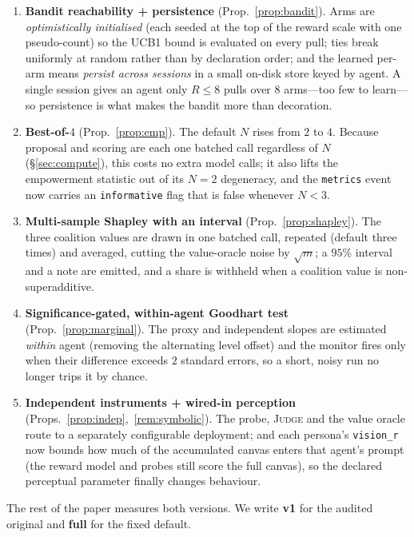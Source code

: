 \documentclass[11pt]{article}
\newcommand{\code}[1]{\texttt{\small #1}}
\newcommand{\JUDGE}{\textsc{Judge}}
\theoremstyle{plain}
\theoremstyle{definition}
\begin{document}
\begin{enumerate}[leftmargin=1.4em,itemsep=2pt,topsep=2pt]
\item \textbf{Bandit reachability + persistence} (Prop.~\ref{prop:bandit}). Arms
      are \emph{optimistically initialised} (each seeded at the top of the reward
      scale with one pseudo-count) so the UCB1 bound is evaluated on every pull;
      ties break uniformly at random rather than by declaration order; and the
      learned per-arm means \emph{persist across sessions} in a small on-disk
      store keyed by agent. A single session gives an agent only $R\le 8$ pulls
      over $8$ arms---too few to learn---so persistence is what makes the bandit
      more than decoration.
\item \textbf{Best-of-$4$} (Prop.~\ref{prop:emp}). The default $N$ rises from $2$
      to $4$. Because proposal and scoring are each one batched call regardless
      of $N$ (\S\ref{sec:compute}), this costs no extra model calls; it also
      lifts the empowerment statistic out of its $N{=}2$ degeneracy, and the
      \code{metrics} event now carries an \code{informative} flag that is false
      whenever $N<3$.
\item \textbf{Multi-sample Shapley with an interval}
      (Prop.~\ref{prop:shapley}). The three coalition values are drawn in one
      batched call, repeated (default three times) and averaged, cutting the
      value-oracle noise by $\sqrt{m}$; a $95\%$ interval and a note are emitted,
      and a share is withheld when a coalition value is non-superadditive.
\item \textbf{Significance-gated, within-agent Goodhart test}
      (Prop.~\ref{prop:marginal}). The proxy and independent slopes are estimated
      \emph{within} agent (removing the alternating level offset) and the monitor
      fires only when their difference exceeds $2$ standard errors, so a short,
      noisy run no longer trips it by chance.
\item \textbf{Independent instruments + wired-in perception}
      (Props.~\ref{prop:indep},~\ref{rem:symbolic}). The probe, \JUDGE{} and the
      value oracle route to a separately configurable deployment; and each
      persona's \code{vision\_r} now bounds how much of the accumulated canvas
      enters that agent's prompt (the reward model and probes still score the
      full canvas), so the declared perceptual parameter finally changes
      behaviour.
\end{enumerate}

The rest of the paper measures both versions. We write \textbf{v1} for the
audited original and \textbf{full} for the fixed default.
\end{document}
